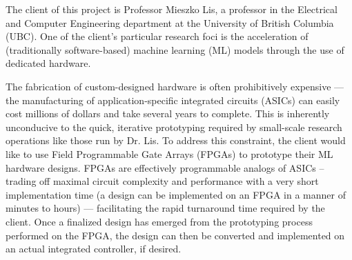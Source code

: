 The client of this project is Professor Mieszko Lis, a professor in the Electrical and Computer Engineering department at the University of British Columbia (UBC). One of the client's particular research foci is the acceleration of (traditionally software-based) machine learning (ML) models through the use of dedicated hardware.

The fabrication of custom-designed hardware is often prohibitively expensive --- the manufacturing of application-specific integrated circuits (ASICs) can easily cost millions of dollars and take several years to complete. This is inherently unconducive to the quick, iterative prototyping required by small-scale research operations like those run by Dr. Lis. To address this constraint, the client would like to use Field Programmable Gate Arrays (FPGAs) to prototype their ML hardware designs. FPGAs are effectively programmable analogs of ASICs -- trading off maximal circuit complexity and performance with a very short implementation time (a design can be implemented on an FPGA in a manner of minutes to hours) --- facilitating the rapid turnaround time required by the client. Once a finalized design has emerged from the prototyping process performed on the FPGA, the design can then be converted and implemented on an actual integrated controller, if desired.
